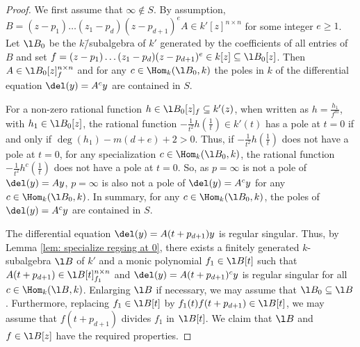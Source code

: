 \documentclass[a4paper, 11pt]{article}
\begin{document}
\begin{proof}
	We first assume that $\infty\notin S$. By assumption,
	$B=(z-p_1)\ldots(z_1-p_d)(z-p_{d+1})^eA\in k'[z]^{n\times n}$ for some integer $e\geq 1$.	
		 Let $\l B_0$ be the $k$\=/subalgebra of $k'$ generated by the coefficients of all entries of $B$ and set $f=(z-p_1)\ldots(z_1-p_d)(z-p_{d+1})^e\in k[z]\subseteq\l B_0[z]$.
	Then $A\in \l B_0[z]_{f}^{n\times n}$ and for any $c \in \Hom_k(\l B_0, k)$ the poles in $k$ of the differential equation $\del (y) =A^c y$ are contained in $S$.
	
	For a non-zero rational function $h\in \l B_0[z]_{f}\subseteq k'(z)$, when written as $h=\frac{h_1}{f^m}$, with $h_1\in\l B_0[z]$, the rational function $-\frac{1}{t^2}h(\frac{1}{t})\in k'(t)$ has a pole at $t=0$ if and only if $\deg(h_1)-m(d+e)+2>0$. Thus, if $-\frac{1}{t^2}h(\frac{1}{t})$ does not have a pole at $t=0$, for any specialization $c\in \Hom_k(\l B_0, k)$, the rational function $-\frac{1}{t^2}h^c(\frac{1}{t})$ does not have a pole at $t=0$. So, as $p=\infty$ is not a pole of $\del(y)=Ay$, 
	$p=\infty$ is also not a pole of $\del(y)=A^cy$ for any $c\in\Hom_k(\l B_0,k)$. In summary, for any $c\in\Hom_k(\l B_0,k)$, the poles of $\del(y)=A^cy$ are contained in $S$.
	
%	
%	
%	
%	
	 The differential equation $\del(y)=A(t+p_{d+1})y$ is regular singular. Thus, by Lemma \ref{lem: specialize regsing at 0}, there exists a finitely generated $k$-subalgebra $\l B$ of $k'$ and a monic polynomial $f_1\in \l B[t]$ such that $A(t+p_{d+1})\in \l B[t]_{f_1}^{n\times n}$ and $\del(y)=A(t+p_{d+1})^cy$ is regular singular for all $c\in\Hom_k(\l B,k)$. Enlarging $\l B$ if necessary, we may assume that $\l B_0\subseteq \l B$. Furthermore, replacing $f_1\in \l B[t]$ by $f_1(t)f(t+p_{d+1})\in \l B[t]$, we may assume that $f(t+p_{d+1})$ divides $f_1$ in $\l B[t]$.
	 We claim that $\l B$ and $f\in\l B[z]$ have the required properties. 
	 

\end{proof}
\end{document}
